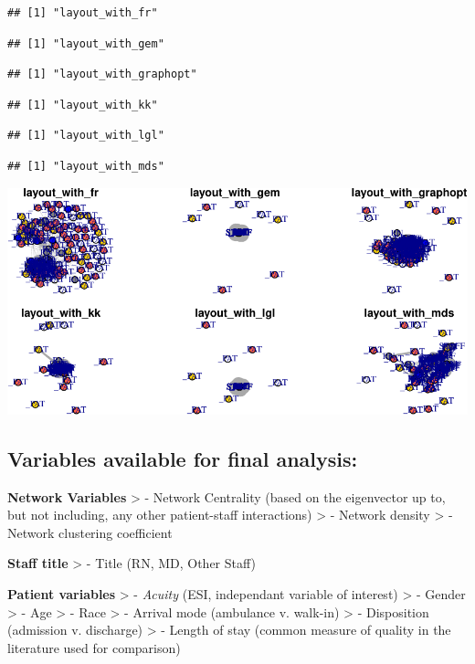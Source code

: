\documentclass[]{elsarticle} %
\makeatletter
\def\maxwidth{\ifdim\Gin@nat@width>\linewidth\linewidth
\else\Gin@nat@width\fi}
\let\Oldincludegraphics\includegraphics
\renewcommand{\includegraphics}[1]{\Oldincludegraphics[width=\maxwidth]{#1}}
\makeatother
\begin{document}
\begin{verbatim}
## [1] "layout_with_fr"
\end{verbatim}

\begin{verbatim}
## [1] "layout_with_gem"
\end{verbatim}

\begin{verbatim}
## [1] "layout_with_graphopt"
\end{verbatim}

\begin{verbatim}
## [1] "layout_with_kk"
\end{verbatim}

\begin{verbatim}
## [1] "layout_with_lgl"
\end{verbatim}

\begin{verbatim}
## [1] "layout_with_mds"
\end{verbatim}

\includegraphics{Flynn_Project_files/figure-latex/unnamed-chunk-1-2.pdf}

\subsection{Variables available for final
analysis:}\label{variables-available-for-final-analysis}

\textbf{Network Variables} \textgreater{} - Network Centrality (based on
the eigenvector up to, but not including, any other patient-staff
interactions) \textgreater{} - Network density \textgreater{} - Network
clustering coefficient

\textbf{Staff title} \textgreater{} - Title (RN, MD, Other Staff)

\textbf{Patient variables} \textgreater{} - \emph{Acuity} (ESI,
independant variable of interest) \textgreater{} - Gender \textgreater{}
- Age \textgreater{} - Race \textgreater{} - Arrival mode (ambulance v.
walk-in) \textgreater{} - Disposition (admission v. discharge)
\textgreater{} - Length of stay (common measure of quality in the
literature used for comparison)
\end{document}

